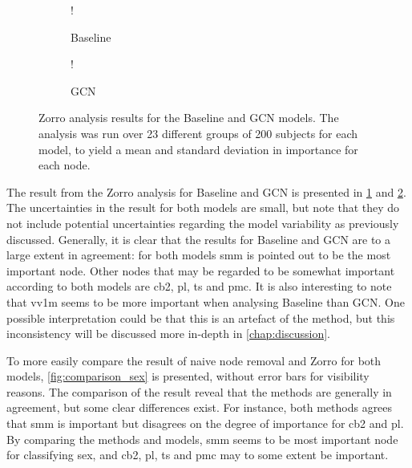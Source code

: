 \begin{figure}[!htbp]
    \centering
        \begin{subfigure}{.5\textwidth}
            \centering
            \begin{center}
                \resizebox {1.0\linewidth} {!} {
                    
                }
            \end{center}
            \caption{Baseline}
            \label{fig:zorro_sex_baseline}
        \end{subfigure}%
        \begin{subfigure}{.5\textwidth}
            \centering
            \begin{center}
                \resizebox {1.0\linewidth} {!} {
                    
                }
            \end{center}
            \caption{GCN}
            \label{fig:zorro_sex_gcn}
        \end{subfigure}
    \caption{Zorro analysis results for the Baseline and GCN models. The analysis was run over 23 different groups of 200 subjects for each model, to yield a mean and standard deviation in importance for each node.}
    \label{fig:zorro_sex}
\end{figure}

The result from the Zorro analysis for Baseline and GCN is presented in \cref{fig:zorro_sex_baseline} and \cref{fig:zorro_sex_gcn}. The uncertainties in the result for both models are small, but note that they do not include potential uncertainties regarding the model variability as previously discussed. Generally, it is clear that the results for Baseline and GCN are to a large extent in agreement: for both models \acrshort{smm} is pointed out to be the most important node. Other nodes that may be regarded to be somewhat important according to both models are \acrshort{cb2}, \acrshort{pl}, \acrshort{ts} and \acrshort{pmc}. It is also interesting to note that \acrshort{vv1m} seems to be more important when analysing Baseline than GCN. One possible interpretation could be that this is an artefact of the method, but this inconsistency will be discussed more in-depth in \cref{chap:discussion}.

To more easily compare the result of naive node removal and Zorro for both models, \cref{fig:comparison_sex} is presented, without error bars for visibility reasons. The comparison of the result reveal that the methods are generally in agreement, but some clear differences exist. For instance, both methods agrees that \acrshort{smm} is important but disagrees on the degree of importance for \acrshort{cb2} and \acrshort{pl}. By comparing the methods and models, \acrshort{smm} seems to be most important node for classifying sex, and \acrshort{cb2}, \acrshort{pl}, \acrshort{ts} and \acrshort{pmc} may to some extent be important.

